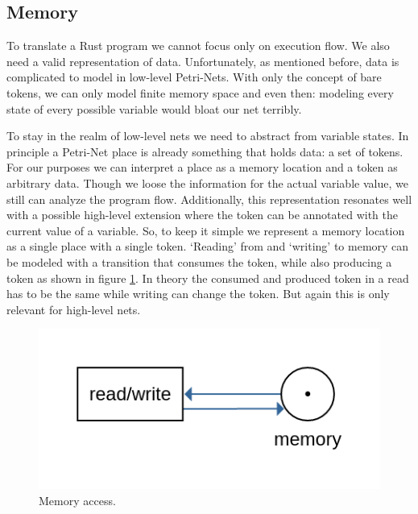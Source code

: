 \subsection{Memory}
To translate a Rust program we cannot focus only on execution flow.
We also need a valid representation of data.
Unfortunately, as mentioned before, data is complicated to model in low-level Petri-Nets.
With only the concept of bare tokens, we can only model finite memory space and even then: modeling every state of every possible variable would bloat our net terribly.

To stay in the realm of low-level nets we need to abstract from variable states.
In principle a Petri-Net place is already something that holds data: a set of tokens.
For our purposes we can interpret a place as a memory location and a token as arbitrary data.
Though we loose the information for the actual variable value, we still can analyze the program flow.
Additionally, this representation resonates well with a possible high-level extension where the token can be annotated with the current value of a variable.
So, to keep it simple we represent a memory location as a single place with a single token.
`Reading' from and `writing' to memory can be modeled with a transition that consumes the token, while also producing a token as shown in figure \ref{memory_access}.
In theory the consumed and produced token in a read has to be the same while writing can change the token.
But again this is only relevant for high-level nets.
\begin{figure}
    \centering
    \includegraphics[width=.4\textwidth]{../diagrams/memoryAccess.png}
    \caption{Memory access.}
    \label{memory_access}
\end{figure}

